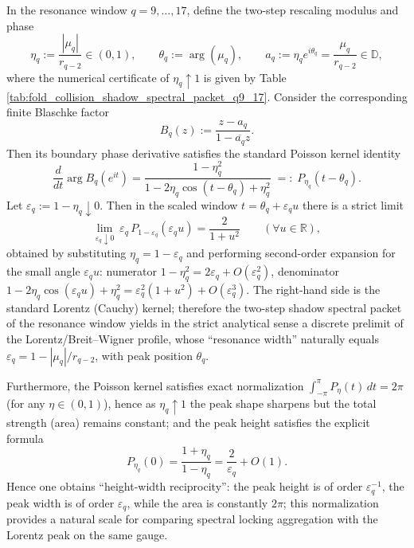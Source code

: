 \begin{remark}[Poisson peak at the two-step rescaling point \texorpdfstring{$\Rightarrow$}{=>} Lorentz limit: Breit--Wigner discrete prelimit of the resonance-window shadow spectral packet]\label{rem:pom-resonance-poisson-lorentz-prelimit}
In the resonance window \(q=9,\dots,17\), define the two-step rescaling modulus and phase
\[
\eta_q:=\frac{|\mu_q|}{r_{q-2}}\in(0,1),\qquad \theta_q:=\arg(\mu_q),
\qquad a_q:=\eta_q e^{i\theta_q}=\frac{\mu_q}{r_{q-2}}\in\mathbb{D},
\]
where the numerical certificate of \(\eta_q\uparrow 1\) is given by Table \ref{tab:fold_collision_shadow_spectral_packet_q9_17}.
Consider the corresponding finite Blaschke factor
\[
B_q(z):=\frac{z-a_q}{1-\overline{a_q}z}.
\]
Then its boundary phase derivative satisfies the standard Poisson kernel identity
\[
\frac{d}{dt}\arg B_q(e^{it})
=\frac{1-\eta_q^{2}}{1-2\eta_q\cos(t-\theta_q)+\eta_q^{2}}
 \;=:\; P_{\eta_q}(t-\theta_q).
\]
Let \(\varepsilon_q:=1-\eta_q\downarrow 0\). Then in the scaled window \(t=\theta_q+\varepsilon_q u\) there is a strict limit
\[
\lim_{\varepsilon_q\downarrow 0}\ \varepsilon_q\,P_{1-\varepsilon_q}(\varepsilon_q u)=\frac{2}{1+u^{2}}
\qquad(\forall u\in\mathbb{R}),
\]
obtained by substituting \(\eta_q=1-\varepsilon_q\) and performing second-order expansion for the small angle \(\varepsilon_q u\): numerator \(1-\eta_q^2=2\varepsilon_q+O(\varepsilon_q^2)\), denominator \(1-2\eta_q\cos(\varepsilon_q u)+\eta_q^2=\varepsilon_q^2(1+u^2)+O(\varepsilon_q^3)\).
The right-hand side is the standard Lorentz (Cauchy) kernel; therefore the two-step shadow spectral packet of the resonance window yields in the strict analytical sense a discrete prelimit of the Lorentz/Breit--Wigner profile, whose ``resonance width'' naturally equals \(\varepsilon_q=1-|\mu_q|/r_{q-2}\), with peak position \(\theta_q\).
\par
Furthermore, the Poisson kernel satisfies exact normalization
\(
\int_{-\pi}^{\pi}P_{\eta}(t)\,dt=2\pi
\)
(for any \(\eta\in(0,1)\)), hence as \(\eta_q\uparrow 1\) the peak shape sharpens but the total strength (area) remains constant; and the peak height satisfies the explicit formula
\[
P_{\eta_q}(0)=\frac{1+\eta_q}{1-\eta_q}=\frac{2}{\varepsilon_q}+O(1).
\]
Hence one obtains ``height-width reciprocity'': the peak height is of order \(\varepsilon_q^{-1}\), the peak width is of order \(\varepsilon_q\), while the area is constantly \(2\pi\); this normalization provides a natural scale for comparing spectral locking aggregation with the Lorentz peak on the same gauge.
\par

\end{remark}
